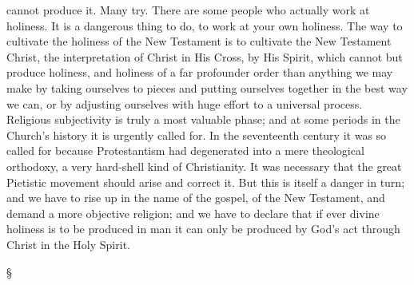 \documentclass[12pt,letterpaper,oneside]{book}
\begin{document}
cannot produce it. Many try. There are some 
people who actually work at holiness. It is a 
dangerous thing to do, to work at your own 
holiness. The way to cultivate the holiness of 
the New Testament is to cultivate the New Testament 
Christ, the interpretation of Christ in 
His Cross, by His Spirit, which cannot but 
produce holiness, and holiness of a far profounder 
order than anything we may make 
by taking ourselves to pieces and putting 
ourselves together in the best way we can, 
or by adjusting ourselves with huge effort 
to a universal process. Religious subjectivity 
is truly a most valuable phase; and at some 
periods in the Church's history it is urgently 
called for. In the seventeenth century it was 
so called for because Protestantism had degenerated 
into a mere theological orthodoxy, 
a very hard-shell kind of Christianity. It was 
necessary that the great Pietistic movement 
should arise and correct it. But this is itself a 
danger in turn; and we have to rise up in the 
name of the gospel, of the New Testament, and 
demand a more objective religion; and we have 
to declare that if ever divine holiness is to be 
produced in man it can only be produced by 
God's act through Christ in the Holy Spirit.   

\begin{center}
\S
\end{center}
\end{document}
